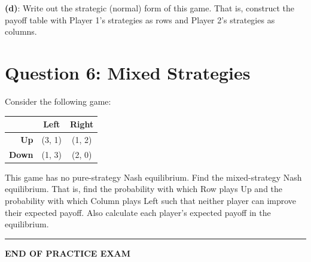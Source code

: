 \documentclass[
  english,
  11pt,
]{article}
\newcounter{none} %
\begin{document}
\vspace{4cm}

\textbf{(d)}: Write out the strategic (normal) form of this game. That
is, construct the payoff table with Player 1's strategies as rows and
Player 2's strategies as columns.

\newpage

\section{Question 6: Mixed
Strategies}\label{question-6-mixed-strategies}

Consider the following game:

{\def\LTcaptype{none} %
\begin{longtable}[]{@{}rcc@{}}
\toprule\noalign{}
& Left & Right \\
\midrule\noalign{}
\endhead
\bottomrule\noalign{}
\endlastfoot
\textbf{Up} & (3, 1) & (1, 2) \\
\textbf{Down} & (1, 3) & (2, 0) \\
\end{longtable}
}

This game has no pure-strategy Nash equilibrium. Find the mixed-strategy
Nash equilibrium. That is, find the probability with which Row plays Up
and the probability with which Column plays Left such that neither
player can improve their expected payoff. Also calculate each player's
expected payoff in the equilibrium.

\vspace{10cm}

\bigskip
\hrule
\bigskip
\begin{center}
\textbf{END OF PRACTICE EXAM}
\end{center}
\end{document}
